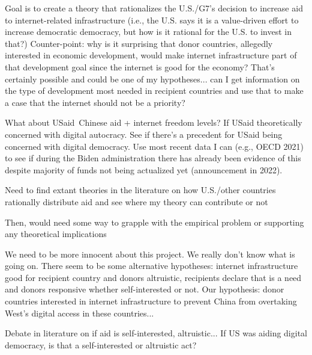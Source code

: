 Goal is to create a theory that rationalizes the U.S./G7's decision to increase aid to internet-related infrastructure (i.e., the U.S. says it is a value-driven effort to increase democratic democracy, but how is it rational for the U.S. to invest in that?) Counter-point: why is it surprising that donor countries, allegedly interested in economic development, would make internet infrastructure part of that development goal since the internet is good for the economy? That's certainly possible and could be one of my hypotheses... can I get information on the type of development most needed in recipient countries and use that to make a case that the internet should not be a priority?

What about USaid~Chinese aid + internet freedom levels? If USaid theoretically concerned with digital autocracy. See if there's a precedent for USaid being concerned with digital democracy. Use most recent data I can (e.g., OECD 2021) to see if during the Biden administration there has already been evidence of this despite majority of funds not being actualized yet (announcement in 2022).

Need to find extant theories in the literature on how U.S./other countries rationally distribute aid and see where my theory can contribute or not

Then, would need some way to grapple with the empirical problem or supporting any theoretical implications

We need to be more innocent about this project. We really don't know what is going on. There seem to be some alternative hypotheses: internet infrastructure good for recipient country and donors altruistic, recipients declare that is a need and donors responsive whether self-interested or not. Our hypothesis: donor countries interested in internet infrastructure to prevent China from overtaking West's digital access in these countries...

Debate in literature on if aid is self-interested, altruistic... If US was aiding digital democracy, is that a self-interested or altruistic act? 
